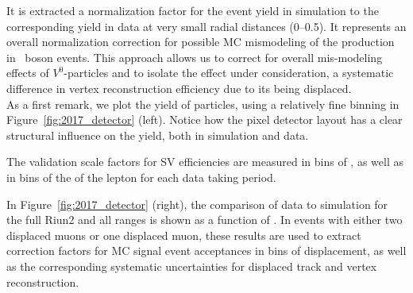 It is extracted a normalization factor for the event yield in
simulation to the corresponding yield in data at very small radial
distances (0--0.5\cm). It represents an overall
normalization correction for possible MC mismodeling of the
\PKzS production in \PZ~boson events. This approach allows us to correct for
overall mis-modeling effects of $V^0$-particles
and to isolate the effect under consideration, \ie a systematic
difference in vertex reconstruction efficiency due to its being
displaced. \\
As a first remark, we plot the yield of \PKzS particles, using a
relatively fine binning in Figure~\ref{fig:2017_detector} (left). Notice how the pixel detector layout has a clear structural influence on the yield, both in simulation and data.

The validation scale factors for SV efficiencies are
measured in bins of \Deltwod, as
well as in bins of the \pt of the lepton
for each data taking period.

In Figure~\ref{fig:2017_detector} (right), the comparison of data to simulation for the full
Riun2 and all \pt ranges is shown as a function of \Deltwod.
In events with either two displaced muons or one displaced muon, these results are used to
extract correction factors for MC signal
event acceptances in bins of displacement, as well as the corresponding systematic
uncertainties for displaced track and vertex reconstruction.

